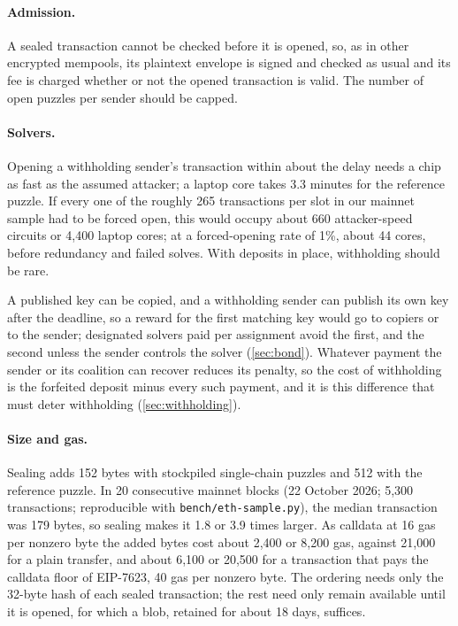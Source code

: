 \paragraph{Admission.}
A sealed transaction cannot be checked before it is opened, so, as in other encrypted mempools, its plaintext envelope is signed and checked as usual and its fee is charged whether or not the opened transaction is valid. The number of open puzzles per sender should be capped.

\paragraph{Solvers.}
Opening a withholding sender's transaction within about the delay needs a chip as fast as the assumed attacker; a laptop core takes 3.3 minutes for the reference puzzle. If every one of the roughly 265 transactions per slot in our mainnet sample had to be forced open, this would occupy about 660 attacker-speed circuits or 4,400 laptop cores; at a forced-opening rate of 1\%, about 44 cores, before redundancy and failed solves. With deposits in place, withholding should be rare.

A published key can be copied, and a withholding sender can publish its own key after the deadline, so a reward for the first matching key would go to copiers or to the sender; designated solvers paid per assignment avoid the first, and the second unless the sender controls the solver (\cref{sec:bond}). Whatever payment the sender or its coalition can recover reduces its penalty, so the cost of withholding is the forfeited deposit minus every such payment, and it is this difference that must deter withholding (\cref{sec:withholding}).

\paragraph{Size and gas.}
\label{sec:size}Sealing adds 152 bytes with stockpiled single-chain puzzles and 512 with the reference puzzle. In 20 consecutive mainnet blocks (22 October 2026; 5,300 transactions; reproducible with \texttt{bench/eth-sample.py}), the median transaction was 179 bytes, so sealing makes it 1.8 or 3.9 times larger. As calldata at 16 gas per nonzero byte the added bytes cost about 2,400 or 8,200 gas, against 21,000 for a plain transfer, and about 6,100 or 20,500 for a transaction that pays the calldata floor of EIP-7623, 40 gas per nonzero byte. The ordering needs only the 32-byte hash of each sealed transaction; the rest need only remain available until it is opened, for which a blob, retained for about 18 days, suffices.

